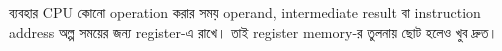 \begin{center}
\end{center}

\begin{examplebox}{ব্যবহার}
CPU কোনো operation করার সময় operand, intermediate result বা instruction address অল্প সময়ের জন্য register-এ রাখে। তাই register memory-র তুলনায় ছোট হলেও খুব দ্রুত।
\end{examplebox}
